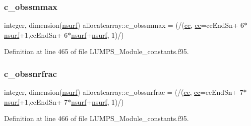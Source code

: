\subsubsection{\texorpdfstring{c\+\_\+obssmmax}{c\_obssmmax}}
{\footnotesize\ttfamily integer, dimension(\hyperlink{namespaceallocatearray_acd22f92a06f7e9a2a91426b3dc99fdb0}{nsurf}) allocatearray\+::c\+\_\+obssmmax = (/(\hyperlink{namespaceallocatearray_ac863c81704eb507dee10f5e10741e10c}{cc}, \hyperlink{namespaceallocatearray_ac863c81704eb507dee10f5e10741e10c}{cc}=cc\+End\+Sn+ 6$\ast$\hyperlink{namespaceallocatearray_acd22f92a06f7e9a2a91426b3dc99fdb0}{nsurf}+1,cc\+End\+Sn+ 6$\ast$\hyperlink{namespaceallocatearray_acd22f92a06f7e9a2a91426b3dc99fdb0}{nsurf}+\hyperlink{namespaceallocatearray_acd22f92a06f7e9a2a91426b3dc99fdb0}{nsurf}, 1)/)}



Definition at line 465 of file L\+U\+M\+P\+S\+\_\+\+Module\+\_\+constants.\+f95.

\mbox{\label{namespaceallocatearray_ad7ba2314a385ef6eacbe331dc96b909b}} 
\subsubsection{\texorpdfstring{c\+\_\+obssnrfrac}{c\_obssnrfrac}}
{\footnotesize\ttfamily integer, dimension(\hyperlink{namespaceallocatearray_acd22f92a06f7e9a2a91426b3dc99fdb0}{nsurf}) allocatearray\+::c\+\_\+obssnrfrac = (/(\hyperlink{namespaceallocatearray_ac863c81704eb507dee10f5e10741e10c}{cc}, \hyperlink{namespaceallocatearray_ac863c81704eb507dee10f5e10741e10c}{cc}=cc\+End\+Sn+ 7$\ast$\hyperlink{namespaceallocatearray_acd22f92a06f7e9a2a91426b3dc99fdb0}{nsurf}+1,cc\+End\+Sn+ 7$\ast$\hyperlink{namespaceallocatearray_acd22f92a06f7e9a2a91426b3dc99fdb0}{nsurf}+\hyperlink{namespaceallocatearray_acd22f92a06f7e9a2a91426b3dc99fdb0}{nsurf}, 1)/)}



Definition at line 466 of file L\+U\+M\+P\+S\+\_\+\+Module\+\_\+constants.\+f95.

\mbox{\label{namespaceallocatearray_a22d9674e6c45c469b459ce0ac39d6320}} 
